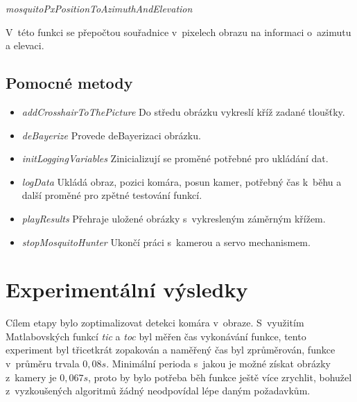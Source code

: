 \documentclass[a4paper,10pt]{article}
\begin{document}

\vspace{0.5cm}
\textit{mosquitoPxPositionToAzimuthAndElevation}

		V~této funkci se přepočtou souřadnice v~pixelech obrazu na informaci o~azimutu a
		elevaci.


\subsection{Pomocné metody}

		\begin{itemize}
				\item \textit{addCrosshairToThePicture} Do středu obrázku vykreslí kříž zadané tloušťky. 
				\item \textit{deBayerize} Provede deBayerizaci obrázku.
				\item \textit{initLoggingVariables} Zinicializují se proměné potřebné pro ukládání dat.
				\item \textit{logData} Ukládá obraz, pozici komára, posun kamer, potřebný čas k~běhu a další proměné pro zpětné testování funkcí.
				\item \textit{playResults} Přehraje uložené obrázky s~vykresleným záměrným křížem.
				\item \textit{stopMosquitoHunter} Ukončí práci s~kamerou a servo mechanismem.
		\end{itemize}

\section{Experimentální výsledky}
		Cílem etapy bylo zoptimalizovat detekci komára v~obraze. 
		S~využitím Matlabovských funkcí \textit{tic} a \textit{toc} byl měřen čas vykonávání funkce, 
		tento experiment byl třicetkrát zopakován a naměřený čas byl zprůměrován, funkce v~průměru trvala $0,08 s$. 
		Minimální perioda s~jakou je možné získat obrázky z~kamery je $0,067 s$, proto by bylo potřeba běh funkce ještě více zrychlit, bohužel z~vyzkoušených algoritmů žádný neodpovídal lépe daným požadavkům. 
\end{document}
